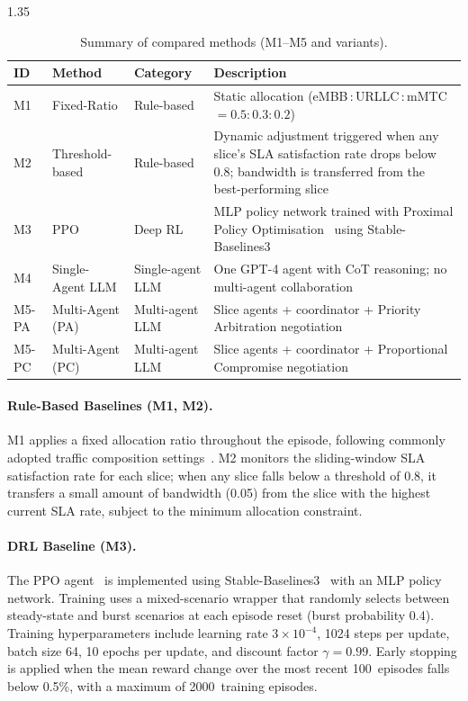 \begin{table}[h]
  \centering
  \begin{spacing}{1.35}
  \caption{Summary of compared methods (M1--M5 and variants).}\vspace{0.7em}
  \label{table:methods}
    \begin{tabular}{|p{1.5cm}|p{2.8cm}|p{3cm}|p{6cm}|}
    \hline
    \textbf{ID} & \textbf{Method} & \textbf{Category} & \textbf{Description} \\
    \hline
    M1 & Fixed-Ratio & Rule-based & Static allocation (eMBB\,:\,URLLC\,:\,mMTC $= 0.5 : 0.3 : 0.2$) \\
    \hline
    M2 & Threshold-based & Rule-based & Dynamic adjustment triggered when any slice's SLA satisfaction rate drops below 0.8; bandwidth is transferred from the best-performing slice \\
    \hline
    M3 & PPO & Deep RL & MLP policy network trained with Proximal Policy Optimisation~\cite{schulman2017ppo} using Stable-Baselines3~\cite{raffin2021sb3} \\
    \hline
    M4 & Single-Agent LLM & Single-agent LLM & One GPT-4 agent with CoT reasoning; no multi-agent collaboration \\
    \hline
    M5-PA & Multi-Agent (PA) & Multi-agent LLM & Slice agents + coordinator + Priority Arbitration negotiation \\
    \hline
    M5-PC & Multi-Agent (PC) & Multi-agent LLM & Slice agents + coordinator + Proportional Compromise negotiation \\
    \hline
    \end{tabular}
  \end{spacing}
\end{table}

\paragraph{Rule-Based Baselines (M1, M2).} M1 applies a fixed allocation ratio throughout the episode, following commonly adopted traffic composition settings~\cite{nasser2025hybrid}. M2 monitors the sliding-window SLA satisfaction rate for each slice; when any slice falls below a threshold of 0.8, it transfers a small amount of bandwidth (0.05) from the slice with the highest current SLA rate, subject to the minimum allocation constraint.

\paragraph{DRL Baseline (M3).} The PPO agent~\cite{schulman2017ppo} is implemented using Stable-Baselines3~\cite{raffin2021sb3} with an MLP policy network. Training uses a mixed-scenario wrapper that randomly selects between steady-state and burst scenarios at each episode reset (burst probability 0.4). Training hyperparameters include learning rate $3 \times 10^{-4}$, 1024 steps per update, batch size 64, 10 epochs per update, and discount factor $\gamma = 0.99$. Early stopping is applied when the mean reward change over the most recent 100~episodes falls below 0.5\%, with a maximum of 2000~training episodes.

